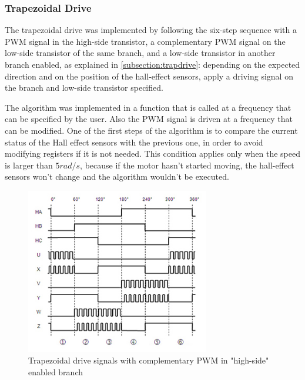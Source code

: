 \subsubsection{Trapezoidal Drive}

The trapezoidal drive was implemented by following the six-step sequence with a \ac{PWM} signal in the high-side transistor, a complementary \ac{PWM} signal on the low-side transistor of the same branch, and a low-side transistor in another branch enabled, as explained in \ref{subsection:trapdrive}: depending on the expected direction and on the position of the hall-effect sensors, apply a driving signal on the branch and low-side transistor specified.

The algorithm was implemented in a function that is called at a frequency that can be specified by the user. Also the \ac{PWM} signal is driven at a frequency that can be modified. One of the first steps of the algorithm is to compare the current status of the Hall effect sensors with the previous one, in order to avoid modifying registers if it is not needed. This condition applies only when the speed is larger than $5 rad/s$, because if the motor hasn't started moving, the hall-effect sensors won't change and the algorithm wouldn't be executed.

\begin{figure}[htbp]
\centering
\includegraphics[width=8cm]{Images/trap_comp.png} 
\caption[Trapezoidal drive with complementary PWM]{Trapezoidal drive signals with complementary PWM in "high-side" enabled branch}
\label{fig:trap_comp}
\end{figure}

